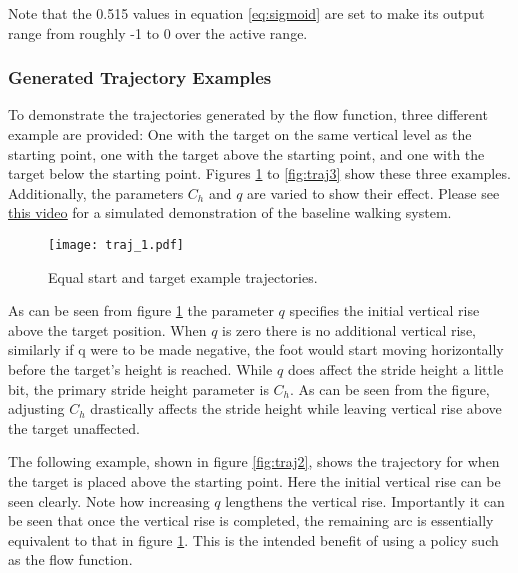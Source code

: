                 \noindent
                Note that the 0.515 values in equation \ref{eq:sigmoid} are set to make its output range from roughly -1 to 0 over the active range.
                
                \newpage
                \subsubsection{Generated Trajectory Examples}
                To demonstrate the trajectories generated by the flow function, three different example are provided: One with the target on the same vertical level as the starting point, one with the target above the starting point, and one with the target below the starting point. Figures \ref{fig:traj1} to \ref{fig:traj3} show these three examples. Additionally, the parameters \(C_h\) and \(q\) are varied to show their effect. Please see \href{https://youtu.be/UfGo_LZfF2c}{\color{blue}\underline{this video}} for a simulated demonstration of the baseline walking system.
                \begin{figure}[h]
                    \centering
                    \texttt{[image: traj\_1.pdf]}
                    \caption{Equal start and target example trajectories.}
                    \label{fig:traj1}
                \end{figure}

                \noindent
                As can be seen from figure \ref{fig:traj1} the parameter \(q\) specifies the initial vertical rise above the target position. When \(q\) is zero there is no additional vertical rise, similarly if q were to be made negative, the foot would start moving horizontally before the target's height is reached. While \(q\) does affect the stride height a little bit, the primary stride height parameter is \(C_h\). As can be seen from the figure, adjusting \(C_h\) drastically affects the stride height while leaving vertical rise above the target unaffected.

                The following example, shown in figure \ref{fig:traj2}, shows the trajectory for when the target is placed above the starting point. Here the initial vertical rise can be seen clearly. Note how increasing \(q\) lengthens the vertical rise. Importantly it can be seen that once the vertical rise is completed, the remaining arc is essentially equivalent to that in figure \ref{fig:traj1}. This is the intended benefit of using a policy such as the flow function.
                
